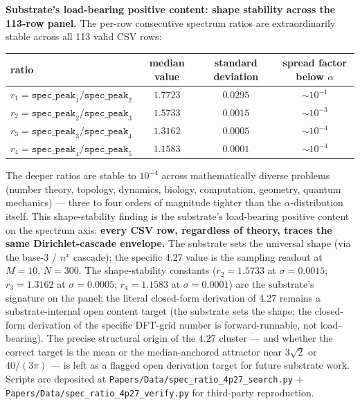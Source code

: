 \documentclass[11pt,a4paper]{amsart}
\theoremstyle{plain}
\theoremstyle{definition}
\begin{document}
\noindent\textbf{Substrate's load-bearing positive content: shape stability across the 113-row panel.} The per-row consecutive spectrum ratios are extraordinarily stable across all 113 valid CSV rows:
\begin{center}
\begin{tabular}{l|c|c|c}
\toprule
ratio & median value & standard deviation & spread factor below $\alpha$ \\
\midrule
$r_1 = \texttt{spec\_peak}_1/\texttt{spec\_peak}_2$ & $1.7723$ & $0.0295$ & $\sim 10^{-1}$ \\
$r_2 = \texttt{spec\_peak}_2/\texttt{spec\_peak}_3$ & $1.5733$ & $0.0015$ & $\sim 10^{-3}$ \\
$r_3 = \texttt{spec\_peak}_3/\texttt{spec\_peak}_4$ & $1.3162$ & $0.0005$ & $\sim 10^{-4}$ \\
$r_4 = \texttt{spec\_peak}_4/\texttt{spec\_peak}_5$ & $1.1583$ & $0.0001$ & $\sim 10^{-4}$ \\
\bottomrule
\end{tabular}
\end{center}
The deeper ratios are stable to $10^{-4}$ across mathematically diverse problems (number theory, topology, dynamics, biology, computation, geometry, quantum mechanics) --- three to four orders of magnitude tighter than the $\alpha$-distribution itself. This shape-stability finding is the substrate's load-bearing positive content on the spectrum axis: \textbf{every CSV row, regardless of theory, traces the same Dirichlet-cascade envelope.} The substrate sets the universal shape (via the base-3 / $n^x$ cascade); the specific 4.27 value is the sampling readout at $M = 10$, $N = 300$. The shape-stability constants ($r_2 = 1.5733$ at $\sigma = 0.0015$; $r_3 = 1.3162$ at $\sigma = 0.0005$; $r_4 = 1.1583$ at $\sigma = 0.0001$) are the substrate's signature on the panel; the literal closed-form derivation of 4.27 remains a substrate-internal open content target (the substrate sets the shape; the closed-form derivation of the specific DFT-grid number is forward-runnable, not load-bearing). The precise structural origin of the $4.27$ cluster --- and whether the correct target is the mean or the median-anchored attractor near $3\sqrt{2}$ or $40/(3\pi)$ --- is left as a flagged open derivation target for future substrate work. Scripts are deposited at \texttt{Papers/Data/spec\_ratio\_4p27\_search.py} + \texttt{Papers/Data/spec\_ratio\_4p27\_verify.py} for third-party reproduction.
\end{document}
